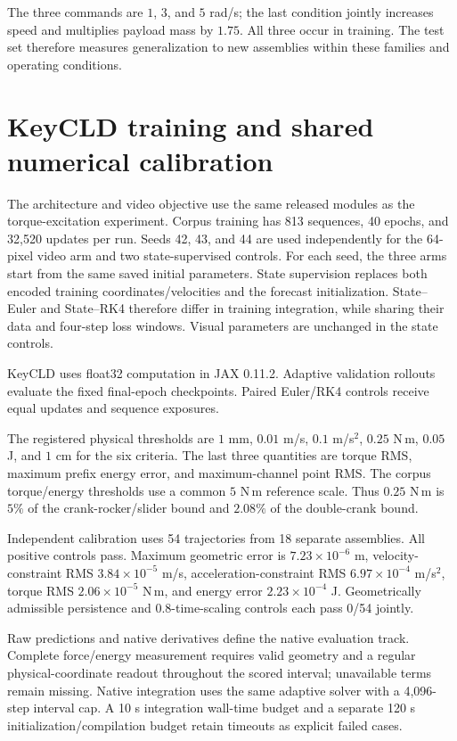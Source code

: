 \documentclass[10pt,twocolumn,letterpaper]{article}
\begin{document}
The three commands are $1$, $3$, and $5$ rad/s; the last condition jointly increases speed and multiplies payload mass by $1.75$. All three occur in training. The test set therefore measures generalization to new assemblies within these families and operating conditions.

\section{KeyCLD training and shared numerical calibration}
The architecture and video objective use the same released modules as the torque-excitation experiment. Corpus training has 813 sequences, 40 epochs, and 32,520 updates per run. Seeds 42, 43, and 44 are used independently for the 64-pixel video arm and two state-supervised controls. For each seed, the three arms start from the same saved initial parameters. State supervision replaces both encoded training coordinates/velocities and the forecast initialization. State--Euler and State--RK4 therefore differ in training integration, while sharing their data and four-step loss windows. Visual parameters are unchanged in the state controls.

KeyCLD uses float32 computation in JAX 0.11.2. Adaptive validation rollouts evaluate the fixed final-epoch checkpoints. Paired Euler/RK4 controls receive equal updates and sequence exposures.

The registered physical thresholds are $1$ mm, $0.01$ m/s, $0.1$ m/s$^2$, $0.25$ N\,m, $0.05$ J, and $1$ cm for the six criteria. The last three quantities are torque RMS, maximum prefix energy error, and maximum-channel point RMS. The corpus torque/energy thresholds use a common $5$ N\,m reference scale. Thus $0.25$ N\,m is $5\%$ of the crank-rocker/slider bound and $2.08\%$ of the double-crank bound.

Independent calibration uses 54 trajectories from 18 separate assemblies. All positive controls pass. Maximum geometric error is $7.23\times10^{-6}$ m, velocity-constraint RMS $3.84\times10^{-5}$ m/s, acceleration-constraint RMS $6.97\times10^{-4}$ m/s$^2$, torque RMS $2.06\times10^{-5}$ N\,m, and energy error $2.23\times10^{-4}$ J. Geometrically admissible persistence and $0.8$-time-scaling controls each pass 0/54 jointly.

Raw predictions and native derivatives define the native evaluation track. Complete force/energy measurement requires valid geometry and a regular physical-coordinate readout throughout the scored interval; unavailable terms remain missing. Native integration uses the same adaptive solver with a 4,096-step interval cap. A 10 s integration wall-time budget and a separate 120 s initialization/compilation budget retain timeouts as explicit failed cases.
\end{document}

